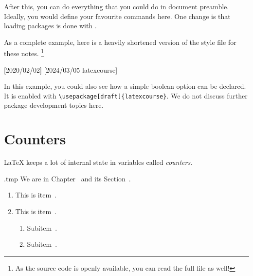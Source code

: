After this, you can do everything that you could do in document preamble.
Ideally, you would define your favourite commands here.
One change is that loading packages is done with .

As a complete example, here is a heavily shortened version of the style file for these notes.%
\footnote{As the source code is openly available, you can read the full file as well!}
%
\begin{ExampleCode}
[2020/02/02]
[2024/03/05 latexcourse]

\ProcessOptions\relax

\RequirePackage{mathtools}
\RequirePackage{csquotes}
\RequirePackage[hidelinks]{hyperref}

\theoremstyle{plain}
\newtheorem{theorem}{Theorem}
\end{ExampleCode}

In this example, you could also see how a simple boolean option can be declared.
It is enabled with \verb|\usepackage[draft]{latexcourse}|.
We do not discuss further package development topics here.



%
%
%
\section{Counters}\label{sec:counters}

\LaTeX{} keeps a lot of internal state in variables called \emph{counters}.

\begin{VerbatimOut}{\jobname.tmp}
We are in Chapter~
and its Section~.

\begin{enumerate}
\item This is item~.
\item This is item~.
  \begin{enumerate}
  \item Subitem~.
  \item Subitem~.
  \end{enumerate}
\end{enumerate}
\end{VerbatimOut}
\ShowExample

